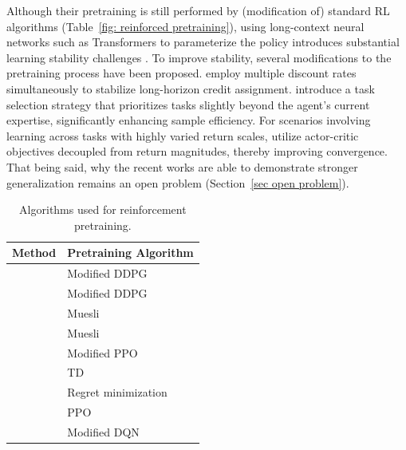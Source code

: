 \documentclass{article}
\begin{document}
Although their pretraining is still performed by (modification of) standard RL algorithms (Table~\ref{fig: reinforced pretraining}),
using long-context neural networks such as Transformers to parameterize the policy introduces substantial learning stability challenges \citep{grigsbyAMAGOScalableContext2024}.
To improve stability, several modifications to the pretraining process have been proposed.
\citet{grigsbyAMAGOScalableContext2024} employ multiple discount rates simultaneously to stabilize long-horizon credit assignment. \citet{teamHumanTimescaleAdaptationOpenEnded2023} introduce a task selection strategy that prioritizes tasks slightly beyond the agent's current expertise, significantly enhancing sample efficiency. For scenarios involving learning across tasks with highly varied return scales, \citet{grigsbyAMAGO2BreakingMultiTask2024} utilize actor-critic objectives decoupled from return magnitudes, thereby improving convergence.
That being said,
why the recent works are able to demonstrate stronger generalization remains an open problem (Section~\ref{sec open problem}).
\begin{table}[h]
    \centering
    \begin{tabular}{|l|l|}
    \hline
    \textbf{Method} & \textbf{Pretraining Algorithm} \\ \hline
    \citet{grigsbyAMAGOScalableContext2024} & \makecell[l]{Modified DDPG \\ \citep{lillicrap2019continuouscontroldeepreinforcement}} \\ \hline
    \citet{grigsbyAMAGO2BreakingMultiTask2024} & Modified DDPG \\ \hline
    \citet{luStructuredStateSpace2023} & Muesli \citep{hessel2021muesli}\\ \hline
    \citet{teamHumanTimescaleAdaptationOpenEnded2023} & Muesli \\ \hline
    \citet{elawadyReLICRecipe64k2024} & \makecell[l]{Modified PPO \\ \citep{schulman2017proximalpolicyoptimizationalgorithms} }\\ \hline
    \citet{wangTransformersLearnTemporal2024} & TD \\ \hline
    \citet{parkLLMAgentsHave2024} & Regret minimization \\ \hline
    \citet{cookArtificialGenerationalIntelligence2024} & PPO \\\hline
    \citet{xuMetaReinforcementLearningRobust2024} & \makecell[l]{Modified DQN\\ \citep{mnih2015human}} \\\hline
    \end{tabular}
    \caption{Algorithms used for reinforcement pretraining.}
    \label{tab: rl_pretraining_outerloop}
\end{table}
\end{document}

